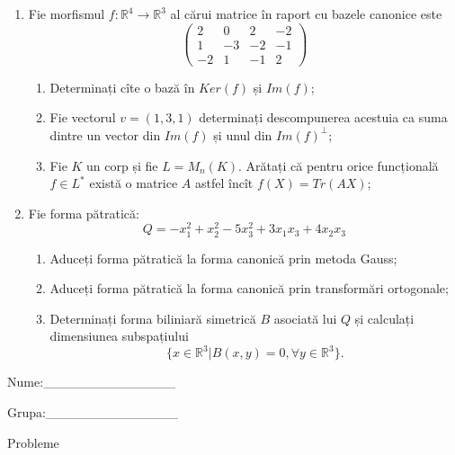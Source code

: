 \documentclass{article}
\begin{document}
\begin{enumerate}
 \item Fie morfismul $f:\mathbb{R}^4 \to \mathbb{R}^3$ al cărui matrice în raport cu bazele canonice este
$$\begin{pmatrix}
2&0&2&-2\\
1&-3&-2&-1\\
-2&1&-1&2
\end{pmatrix}$$

\begin{enumerate}
\item Determinați cîte o bază în $Ker(f)$ și $Im(f)$;
\item Fie vectorul $v=(1,3,1)$ determinați descompunerea acestuia ca suma dintre un vector din $Im(f)$ și unul din $Im(f)^\perp$;
\item Fie $K$ un corp și fie $L=M_n(K)$. Arătați că pentru orice funcțională $f \in L^*$ există o matrice $A$ astfel încît $f(X)=Tr(AX)$;
\end{enumerate}
\item Fie forma pătratică:
$$Q= -x_1^2+x_2^2-5x_3^2+3x_1x_3+4x_2x_3$$

\begin{enumerate}
\item Aduceți forma pătratică la forma canonică prin metoda Gauss;
\item Aduceți forma pătratică la forma canonică prin transformări ortogonale;
\item Determinați forma biliniară simetrică $B$ asociată lui $Q$ și calculați dimensiunea subspațiului
$$\{x \in \mathbb{R}^3 | B(x,y)=0,\forall y \in \mathbb{R}^3\}.$$

\end{enumerate}
\end{enumerate}
\newpage
\begin{flushright}
Nume:\_\_\_\_\_\_\_\_\_\_\_\_\_\_
 
 
Grupa:\_\_\_\_\_\_\_\_\_\_\_\_\_\_
\end{flushright}
\begin{center}
\vspace{2cm}
{\Large Probleme}
\vspace{2cm}
\end{center}
\end{document}
